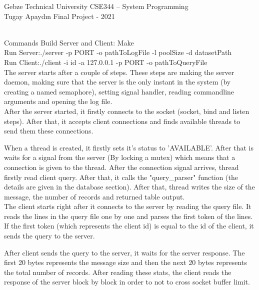 \documentclass[12pt, a4paper]{article}
\begin{document}
\noindent Gebze Technical University \hfill CSE344 – System Programming\\
\noindent Tugay Apaydın \hfill Final Project - 2021\\
 \\

\justify

Commands
\justify
\small
Build Server and Client:\hspace{2mm} Make\\
Run Server:\hspace{2mm}./server -p PORT -o pathToLogFile -l poolSize -d datasetPath \\
Run Client:\hspace{2mm}./client -i id -a 127.0.0.1 -p PORT -o pathToQueryFile\\

\justify
The server starts after a couple of steps. These steps are making the server daemon, making sure that the server is the only instant in the system (by creating a named semaphore), setting signal handler, reading commandline arguments and opening the log file.\\
After the server started, it firstly connects to the socket (socket, bind and listen steps). After that, it accepts client connections and finds available threads to send them these connections. 

When a thread is created, it firstly sets it's status to 'AVAILABLE'. After that is waits for a signal from the server (By locking a mutex) which means that a connection is given to the thread. After the connection signal arrives, thread firstly read client query. After that, it calls the "query\_parser" function (the details are given in the database section). After that, thread writes the size of the message, the number of records and returned table output.\\

\justify
The client starts right after it connects to the server by reading the query file. It reads the lines in the query file one by one and parses the first token of the lines. If the first token (which represents the client id) is equal to the id of the client, it sends the query to the server.

After client sends the query to the server, it waits for the server response. The first 20 bytes represents the message size and then the next 20 bytes represents the total number of records. After reading these stats, the client reads the response of the server block by block in order to not to cross socket buffer limit.\\
\end{document}

